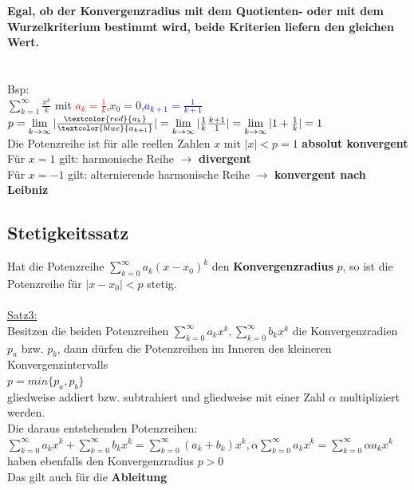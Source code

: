\documentclass[12pt,a4paper]{article}
\begin{document}
\textbf{Egal, ob der Konvergenzradius mit dem Quotienten- oder mit
dem Wurzelkriterium bestimmt wird, beide Kriterien liefern
den gleichen Wert.}\\
\\
\\Bsp:\\
$\sum\limits_{k=1}^{\infty}\frac{x^k}{k}$ mit \textcolor{red}{$a_k=\frac{1}{k}$},$x_0=0$,\textcolor{blue}{$a_{k+1}=\frac{1}{k+1}$}\\
$p=\lim\limits_{k\rightarrow\infty}|\frac{\textcolor{red}{a_k}}{\textcolor{blue}{a_{k+1}}}|=\lim\limits_{k\rightarrow\infty}|\frac{1}{k}\frac{k+1}{1}|=\lim\limits_{k\rightarrow\infty}|1+\frac{1}{k}|=1$\\
Die Potenzreihe ist für alle reellen Zahlen $x$ mit $|x|<p=1$ \textbf{absolut konvergent}\\
Für $x=1$ gilt: harmonische Reihe $\rightarrow$ \textbf{divergent}\\
Für $x=-1$ gilt: alternierende harmonische Reihe $\rightarrow$ \textbf{konvergent nach Leibniz}
\subsection{Stetigkeitssatz}
Hat die Potenzreihe $\sum\limits_{k=0}^{\infty}a_k(x-x_0)^k$ den \textbf{Konvergenzradius} $p$, so ist die Potenzreihe für $|x-x_0|<p$ stetig.
\\
\\
\underline{Satz3:}\\
Besitzen die beiden Potenzreihen $\sum\limits_{k=0}^{\infty}a_kx^k,\sum\limits_{k=0}^{\infty}b_kx^k$ die Konvergenzradien $p_a$ bzw. $p_b$, dann dürfen die Potenzreihen im Inneren des kleineren Konvergenzintervalls\\
$p=min\{p_a,p_b\} $ \\
gliedweise addiert bzw. subtrahiert und gliedweise mit einer Zahl $\alpha$ multipliziert werden.\\
Die daraus entstehenden Potenzreihen:\\
$\sum\limits_{k=0}^{\infty}a_kx^k+\sum\limits_{k=0}^{\infty}b_kx^k=\sum\limits_{k=0}^{\infty}(a_k+b_k)x^k,\alpha\sum\limits_{k=0}^{\infty}a_kx^k=\sum\limits_{k=0}^{\infty}\alpha a_kx^k$\\
haben ebenfalls den Konvergenzradius $p>0$
\\
Das gilt auch für die \textbf{Ableitung}
\end{document}

